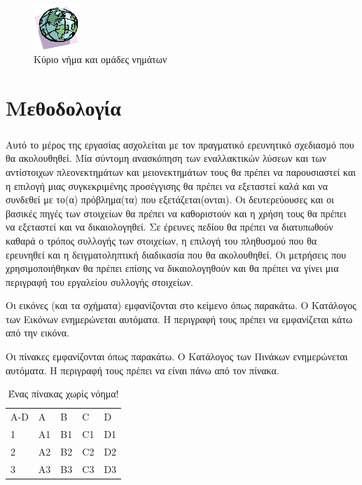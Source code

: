 \documentclass[12pt]{article}
\begin{document}
\begin{figure}[htbp]
\includegraphics[width=0.15\textwidth]{figure1}
\captionsetup{justification=raggedright, singlelinecheck=false}
\caption{Κύριο νήμα και ομάδες νημάτων}
\label{fig:fork_join}
\end{figure}

\clearpage
\section{Μεθοδολογία}
\subparagraph{}
Αυτό το μέρος της εργασίας ασχολείται με τον πραγματικό ερευνητικό σχεδιασμό που θα ακολουθηθεί. Μία σύντομη ανασκόπηση των εναλλακτικών λύσεων και των αντίστοιχων πλεονεκτημάτων και μειονεκτημάτων τους θα πρέπει να παρουσιαστεί και η επιλογή μιας συγκεκριμένης προσέγγισης θα πρέπει να εξεταστεί καλά και να συνδεθεί με το(α) πρόβλημα(τα) που εξετάζεται(ονται). Οι δευτερεύουσες και οι βασικές πηγές των στοιχείων θα πρέπει να καθοριστούν και η χρήση τους θα πρέπει να εξεταστεί και να δικαιολογηθεί. Σε έρευνες πεδίου θα πρέπει να διατυπωθούν καθαρά  ο τρόπος συλλογής των στοιχείων, η επιλογή του πληθυσμού που θα ερευνηθεί και η δειγματοληπτική διαδικασία που θα ακολουθηθεί. Οι μετρήσεις που χρησιμοποιήθηκαν θα πρέπει επίσης να δικαιολογηθούν και θα πρέπει να γίνει μια περιγραφή του εργαλείου συλλογής στοιχείων.

Οι εικόνες (και τα σχήματα) εμφανίζονται στο κείμενο όπως παρακάτω. Ο Κατάλογος των Εικόνων ενημερώνεται αυτόματα. Η περιγραφή τους πρέπει να εμφανίζεται κάτω από την εικόνα.



Οι πίνακες εμφανίζονται όπως παρακάτω. Ο Κατάλογος των Πινάκων ενημερώνεται αυτόματα. Η περιγραφή τους πρέπει να είναι πάνω από τον πίνακα.
\begin{table}[htbp]
\captionsetup{justification=raggedright,
singlelinecheck=false
}
\caption{Ένας πίνακας χωρίς νόημα!}
\begin{otherlanguage}{english}
\def\arraystretch{1.5}
\begin{tabular}{| p{2.0cm} | p{2.0cm}| p{2.0cm} | p{2.0cm} | p{2.0cm} |}
\cline{1-5}
A-D & A & B & C & D \\
\cline{1-5}
1 & A1 & B1 & C1 & D1 \\
\cline{1-5}
2 & A2 & B2 & C2 & D2 \\
\cline{1-5}
3 & A3 & B3 & C3 & D3 \\
\cline{1-5}
\end{tabular}
\end{otherlanguage}
\end{table}
\end{document}
